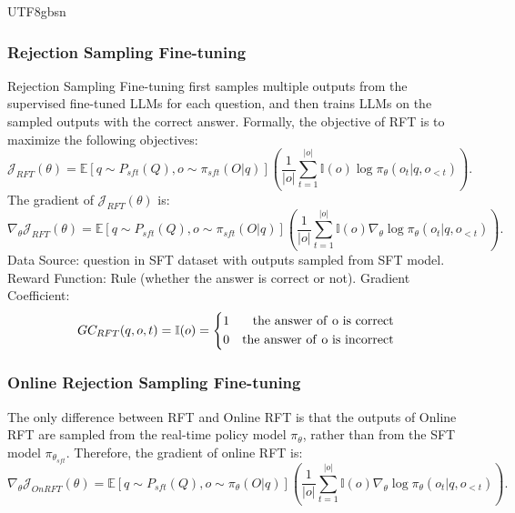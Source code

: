 \documentclass[11pt, a4paper, logo, copyright, nonumbering]{deepseek}
\begin{document}
\begin{CJK*}{UTF8}{gbsn}
\subsubsection{Rejection Sampling Fine-tuning} 
Rejection Sampling Fine-tuning first samples multiple outputs from the supervised fine-tuned LLMs for each question, and then trains LLMs on the sampled outputs with the correct answer.
Formally, the objective of RFT is to maximize the following objectives:
\begin{equation}
\mathcal{J}_{RFT}(\theta)= \mathbb{E}[q \sim P_{sft}(Q), o \sim \pi_{sft}(O|q)]\left( \frac{1}{|o|}\sum_{t=1}^{|o|} \mathbb{I}(o) \log \pi_\theta(o_{t} | q, o_{<t})\right).
\end{equation}
The gradient of $\mathcal{J}_{RFT}(\theta)$ is:
\begin{equation}
\nabla_{\theta}\mathcal{J}_{RFT}(\theta)= \mathbb{E}[{q \sim P_{sft}(Q), o \sim \pi_{sft}(O|q)}]\left( \frac{1}{|o|}\sum_{t=1}^{|o|} {\mathbb{I}(o)} \nabla_{\theta}\log \pi_\theta(o_{t} | q, o_{<t})\right).
\end{equation}
Data Source: question in SFT dataset with outputs sampled from SFT model. Reward Function: Rule (whether the answer is correct or not). Gradient Coefficient:
\begin{equation}
GC_{RFT}(q, o, t) = \mathbb{I}(o)=\left\{
\begin{aligned}
1  & & {\rm the \ answer \ of \ o \ is \ correct} \\
0  & & {\rm the \ answer \ of \ o \ is \ incorrect} \\
\end{aligned}
\right.
\label{eq:GC-RFT}
\end{equation}
\subsubsection{Online Rejection Sampling Fine-tuning}
The only difference between RFT and Online RFT is that the outputs of Online RFT are sampled from the real-time policy model $\pi_{\theta}$, rather than from the SFT model $\pi_{\theta_{sft}}$. Therefore, the gradient of online RFT is:
\begin{equation}
\nabla_{\theta}\mathcal{J}_{OnRFT}(\theta)= \mathbb{E}[{q \sim P_{sft}(Q), o \sim \pi_{\theta}(O|q)}]\left( \frac{1}{|o|}\sum_{t=1}^{|o|} {\mathbb{I}(o)} \nabla_{\theta}\log \pi_\theta(o_{t} | q, o_{<t})\right).
\end{equation}


\end{CJK*}
\end{document}
